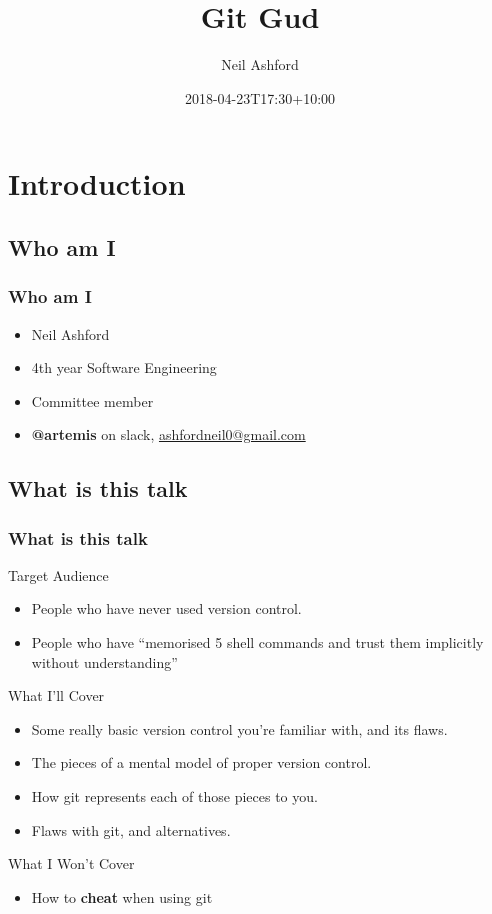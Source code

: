 \documentclass{beamer}
\title{Git Gud}
\author{Neil Ashford}
\institute{UQ Computing Society}
\date{2018-04-23T17:30+10:00}
\begin{document}
\begin{frame}
    \titlepage
\end{frame}

\section{Introduction}

\subsection{Who am I}
\begin{frame}
    \frametitle{Who am I}
    \begin{itemize}[<+->]
        \item Neil Ashford
        \item 4th year Software Engineering
        \item Committee member
        \item \textbf{@artemis} on slack, \url{ashfordneil0@gmail.com}
    \end{itemize}
\end{frame}

\subsection{What is this talk}
\begin{frame}
    \frametitle{What is this talk}
    Target Audience
    \pause
    \begin{itemize}[<+->]
        \item People who have never used version control.
        \item People who have ``memorised 5 shell commands and trust them implicitly without understanding''
    \end{itemize}
    \pause
    What I'll Cover
    \begin{itemize}[<+->]
        \item Some really basic version control you're familiar with, and its flaws.
        \item The pieces of a mental model of proper version control.
        \item How git represents each of those pieces to you.
        \item Flaws with git, and alternatives.
    \end{itemize}
    \pause
    What I Won't Cover
    \begin{itemize}[<+->]
        \item How to \textbf{cheat} when using git
    \end{itemize}
\end{frame}
\end{document}
